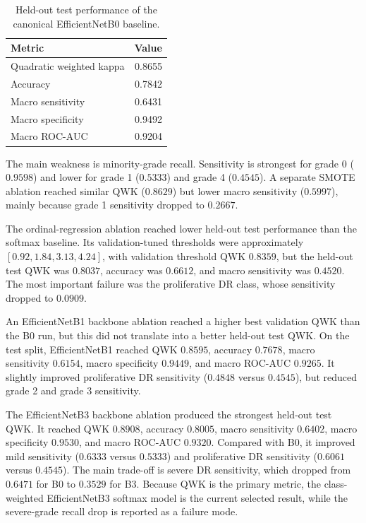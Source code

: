 \documentclass[11pt,a4paper]{article}
\begin{document}
\begin{table}[t]
  \centering
  \caption{Held-out test performance of the canonical EfficientNetB0 baseline.}
  \label{tab:test-results}
  \begin{tabular}{lr}
    \toprule
    Metric & Value \\
    \midrule
    Quadratic weighted kappa & 0.8655 \\
    Accuracy & 0.7842 \\
    Macro sensitivity & 0.6431 \\
    Macro specificity & 0.9492 \\
    Macro ROC-AUC & 0.9204 \\
    \bottomrule
  \end{tabular}
\end{table}

The main weakness is minority-grade recall. Sensitivity is strongest for grade
0 (\(0.9598\)) and lower for grade 1 (\(0.5333\)) and grade 4 (\(0.4545\)).
A separate SMOTE ablation reached similar QWK (\(0.8629\)) but lower macro
sensitivity (\(0.5997\)), mainly because grade 1 sensitivity dropped to
\(0.2667\).

The ordinal-regression ablation reached lower held-out test performance than
the softmax baseline. Its validation-tuned thresholds were approximately
\([0.92, 1.84, 3.13, 4.24]\), with validation threshold QWK \(0.8359\), but the
held-out test QWK was \(0.8037\), accuracy was \(0.6612\), and macro
sensitivity was \(0.4520\). The most important failure was the proliferative
DR class, whose sensitivity dropped to \(0.0909\).

An EfficientNetB1 backbone ablation reached a higher best validation QWK than
the B0 run, but this did not translate into a better held-out test QWK. On the
test split, EfficientNetB1 reached QWK \(0.8595\), accuracy \(0.7678\), macro
sensitivity \(0.6154\), macro specificity \(0.9449\), and macro ROC-AUC
\(0.9265\). It slightly improved proliferative DR sensitivity
(\(0.4848\) versus \(0.4545\)), but reduced grade 2 and grade 3 sensitivity.

The EfficientNetB3 backbone ablation produced the strongest held-out test QWK.
It reached QWK \(0.8908\), accuracy \(0.8005\), macro sensitivity \(0.6402\),
macro specificity \(0.9530\), and macro ROC-AUC \(0.9320\). Compared with B0,
it improved mild sensitivity (\(0.6333\) versus \(0.5333\)) and proliferative
DR sensitivity (\(0.6061\) versus \(0.4545\)). The main trade-off is severe DR
sensitivity, which dropped from \(0.6471\) for B0 to \(0.3529\) for B3. Because
QWK is the primary metric, the class-weighted EfficientNetB3 softmax model is
the current selected result, while the severe-grade recall drop is reported as
a failure mode.
\end{document}

